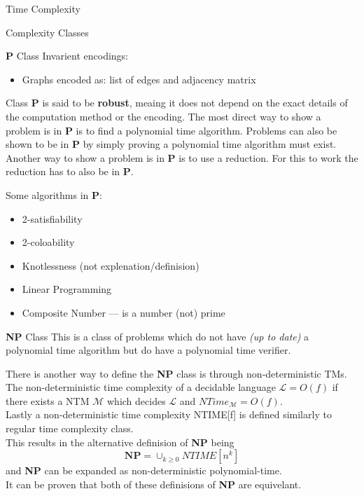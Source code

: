 \documentclass[12pt, letterpaper]{article}
\begin{document}
\begin{section}{Time Complexity}
\begin{subsection}{Complexity Classes}
\begin{subsubsection}{\textbf{P} Class}
      Invarient encodings:
      \begin{itemize}
        \item Graphs encoded as: list of edges and adjacency matrix
      \end{itemize}

      Class \textbf{P} is said to be \textbf{robust}, meaing it does not
      depend on the exact details of the computation method or the encoding.
      The most direct way to show a problem is in \textbf{P} is to find
      a polynomial time algorithm. Problems can also be shown to be in \textbf{P}
      by simply proving a polynomial time algorithm must exist.
      Another way to show a problem is in \textbf{P} is to use a reduction.
      For this to work the reduction has to also be in \textbf{P}.

      Some algorithms in \textbf{P}:
      \begin{itemize}
        \item 2-satisfiability
        \item 2-coloability
        \item Knotlessness (not explenation/definision)
        \item Linear Programming
        \item Composite Number --- is a number (not) prime
      \end{itemize}
    \end{subsubsection}

    \begin{subsubsection}{\textbf{NP} Class}
      This is a class of problems which do not have \textit{(up to date)}
      a polynomial time algorithm but do have a polynomial time verifier.

      There is another way to define the \textbf{NP} class is through
      non-deterministic TMs. The non-deterministic time complexity
      of a decidable language \(\mathscr{L} = O(f)\) if there exists a NTM
      \(\mathscr{M}\) which decides \(\mathscr{L}\) and \(NTime_{\mathscr{M}} = O(f)\). \\
      Lastly a non-deterministic time complexity NTIME[f] is defined similarly to
      regular time complexity class. \\
      This results in the alternative definision of \textbf{NP} being
      \[\textbf{NP} = \cup_{k \geq 0} NTIME[n^{k}]\]
      and \textbf{NP} can be expanded as non-deterministic polynomial-time. \\
      It can be proven that both of these definisions of \textbf{NP} are equivelant.


\end{subsubsection}
\end{subsection}
\end{section}
\end{document}
